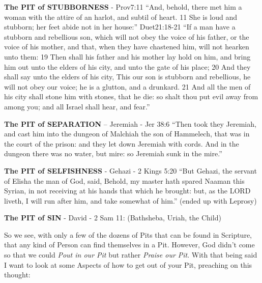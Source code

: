 \begin{compactenum}[I.][9]
    \item \textbf{The PIT of STUBBORNESS} - Prov7:11 “And, behold, there met him a woman with the attire of an harlot, and subtil of heart. 11 She is loud and stubborn; her feet abide not in her house:” Duet21:18-21 “If a man have a stubborn and rebellious son, which will not obey the voice of his father, or the voice of his mother, and that, when they have chastened him, will not hearken unto them: 19 Then shall his father and his mother lay hold on him, and bring him out unto the elders of his city, and unto the gate of his place; 20 And they shall say unto the elders of his city, This our son is stubborn and rebellious, he will not obey our voice; he is a glutton, and a drunkard. 21 And all the men of his city shall stone him with stones, that he die: so shalt thou put evil away from among you; and all Israel shall hear, and fear.”
    \item \textbf{The PIT of SEPARATION} – Jeremiah - Jer 38:6 ``Then took they Jeremiah, and cast him into the dungeon of Malchiah the son of Hammelech, that was in the court of the prison: and they let down Jeremiah with cords. And in the dungeon there was no water, but mire: so Jeremiah sunk in the mire.''
    \item \textbf{The PIT of SELFISHNESS} - Gehazi - 2 Kings 5:20 ``But Gehazi, the servant of Elisha the man of God, said, Behold, my master hath spared Naaman this Syrian, in not receiving at his hands that which he brought: but, as the LORD liveth, I will run after him, and take somewhat of him.'' (ended up with Leprosy)
    \item \textbf{The PIT of SIN} - David - 2 Sam 11: (Bathsheba, Uriah, the Child)
\end{compactenum}
So we see, with only a few of the dozens of Pits that can be found in Scripture, that any kind of Person can find themselves in a Pit. However, God didn't come so that we could \emph{Pout in our Pit} but rather \emph{Praise our Pit}. With that being said I want to look at some Aspects of how to get out of your Pit, preaching on this thought:
